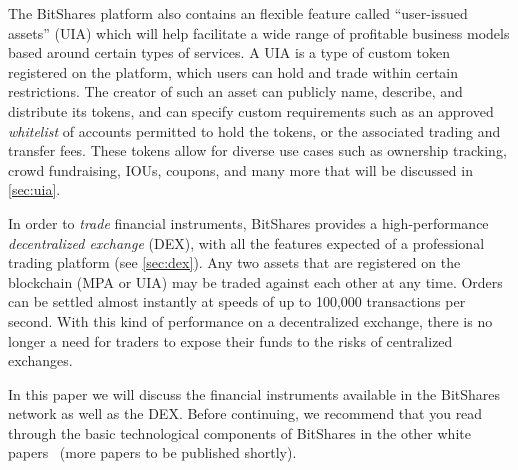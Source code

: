 The BitShares platform also contains an flexible feature called ``user-issued
assets'' (UIA) which will help facilitate a wide range of profitable business
models based around certain types of services. A UIA is a type of custom token
registered on the platform, which users can hold and trade within certain
restrictions. The creator of such an asset can publicly name, describe, and
distribute its tokens, and can specify custom requirements such as an approved
\emph{whitelist} of accounts permitted to hold the tokens, or the associated
trading and transfer fees. These tokens allow for diverse use cases such as
ownership tracking, crowd fundraising, IOUs, coupons, and many more that will
be discussed in \cref{sec:uia}.

In order to \emph{trade} financial instruments, BitShares provides a
high-performance \emph{decentralized exchange} (DEX), with all the features
expected of a professional trading platform (see \cref{sec:dex}). Any two
assets that are registered on the blockchain (MPA or UIA) may be traded against
each other at any time. Orders can be settled almost instantly at speeds of up
to 100,000 transactions per second. With this kind of performance on a
decentralized exchange, there is no longer a need for traders to expose their
funds to the risks of centralized exchanges.

In this paper we will discuss the financial instruments available in the
BitShares network as well as the DEX. Before continuing, we recommend that you
read through the basic technological components of BitShares in the other white
papers~\cite{bts:general} (more papers to be published shortly).
